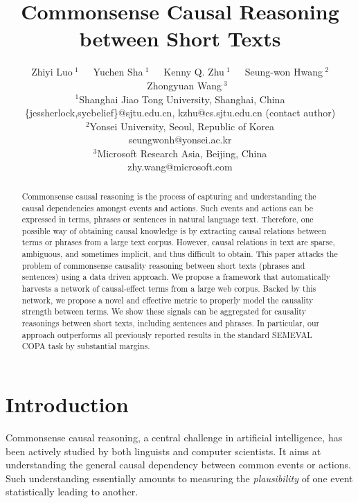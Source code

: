 \documentclass[letterpaper]{article}
\begin{document}
\title{Commonsense Causal Reasoning between Short Texts}

\author{
\AND
Zhiyi Luo{\small $~^{1}$}~~~Yuchen Sha{\small $~^{1}$}~~~Kenny Q. Zhu{\small $~^{1}$}~~~Seung-won Hwang{\small $~^{2}$}~~~Zhongyuan Wang{\small $~^{3}$}\\
{\small $^{1}$}Shanghai Jiao Tong University, Shanghai, China\\
\{jessherlock,sycbelief\}@sjtu.edu.cn, kzhu@cs.sjtu.edu.cn (contact author)\\
{\small $^{2}$}Yonsei University, Seoul, Republic of Korea\\
seungwonh@yonsei.ac.kr\\
{\small $^{3}$}Microsoft Research Asia, Beijing, China\\
zhy.wang@microsoft.com
}

\maketitle
\begin{abstract}
Commonsense causal reasoning is the process of capturing and understanding
the causal dependencies amongst events and actions.
Such events and actions can be expressed in terms, phrases or
sentences in natural language text.
Therefore, one possible way of obtaining causal knowledge is by extracting
causal relations between terms or phrases from a large text corpus.
However, causal relations in text are sparse, ambiguous, and sometimes implicit,
and thus difficult to obtain.
This paper attacks the problem of commonsense causality reasoning between short
texts (phrases and sentences) using a data driven approach.
We propose a framework that automatically harvests a network of
causal-effect terms from a large web corpus.
Backed by this network, we propose a novel and effective metric to properly
model the causality strength between terms. We show these signals
can be aggregated for causality reasonings between
short texts, including sentences and phrases.
In particular, our approach outperforms all previously
reported results in the standard SEMEVAL COPA task by substantial margins.
\end{abstract}

% 
\section{Introduction}
\label{sec:intro}

Commonsense causal reasoning, a central challenge in artificial intelligence,
has been actively studied by both linguists and computer scientists.
It aims at understanding the general causal dependency
between common events or actions.
Such understanding essentially amounts to measuring the {\em plausibility} of
one event statistically leading to another.
\end{document}
